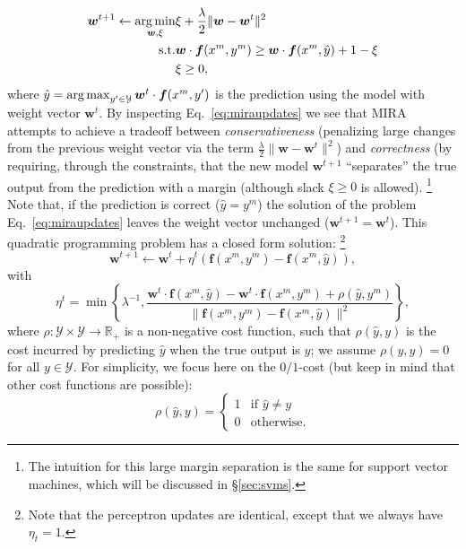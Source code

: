 \begin{eqnarray}\label{eq:miraupdates} 
\boldsymbol{w}^{t+1} \leftarrow \operatorname*{arg\,min}_{\boldsymbol{w}, \xi} & \xi  + \frac{\lambda}{2} \|\boldsymbol{w} - \boldsymbol{w}^t\|^2 \\
\text{s.t.} & \boldsymbol{w} \cdot \boldsymbol{f}(x^m,y^m) \ge \boldsymbol{w} \cdot\boldsymbol{f}(x^m,\hat{y}) + 1 - \xi\\
& \xi \ge 0,
\end{eqnarray} 
where $\hat{y}=\operatorname*{arg\,max}_{y'\in\mathcal{Y}} \boldsymbol{w}^t \cdot \boldsymbol{f}(x^m,y')$ is the prediction using the model with weight vector 
$\boldsymbol{w}^t$. By inspecting Eq.~\ref{eq:miraupdates} we see that MIRA attempts to achieve a tradeoff between \emph{conservativeness} 
(penalizing large changes from the previous weight vector via the term $\frac{\lambda}{2} \|\boldsymbol{w} - \boldsymbol{w}^t\|^2$) 
and \emph{correctness} (by requiring, through the constraints, that the new model  $\boldsymbol{w}^{t+1}$ ``separates'' the true output 
from the prediction with a margin (although slack $\xi \ge 0$ is allowed).%
\footnote{The intuition for this large margin separation is the same for support vector machines, which will be discussed in \S\ref{sec:svms}.} %
Note that, if the prediction is correct ($\hat{y}=y^m$) the solution of the problem 
Eq.~\ref{eq:miraupdates} leaves the weight vector unchanged ($\boldsymbol{w}^{t+1}=\boldsymbol{w}^t$). 
This quadratic programming problem has a closed form solution:%
\footnote{Note that the perceptron updates are identical, except that we always have $\eta_t=1$.} %
$$\boldsymbol{w}^{t+1} \leftarrow  \boldsymbol{w}^{t} + \eta^t  (\boldsymbol{f}(x^m,y^m) - \boldsymbol{f}(x^m,\hat{y})),$$ 
with $$\eta^t = \min\left\{\lambda^{-1}, \frac{\boldsymbol{w}^t \cdot \boldsymbol{f}(x^m,\hat{y}) - 
\boldsymbol{w}^t \cdot \boldsymbol{f}(x^m,y^m) + \rho(\hat{y},y^m)}{\|\boldsymbol{f}(x^m,y^m) - \boldsymbol{f}(x^m,\hat{y})\|^2}\right\},$$
where $\rho: \mathcal{Y} \times \mathcal{Y} \rightarrow \mathbb{R}_+$ is a non-negative cost function, 
such that $\rho(\hat{y},y)$ is the cost incurred by predicting $\hat{y}$ when the true output is $y$; 
we assume $\rho(y,y) = 0$ for all $y \in \mathcal{Y}$. 
For simplicity, we focus here on the $0/1$-cost (but keep in mind that other cost functions are possible): 
\begin{equation}\label{eq:costfunc}
\rho(\hat{y},y) = \left\{
\begin{array}{ll}
1 & \text{if $\hat{y} \ne y$}\\
0 & \text{otherwise.}
\end{array}
\right.
\end{equation}

